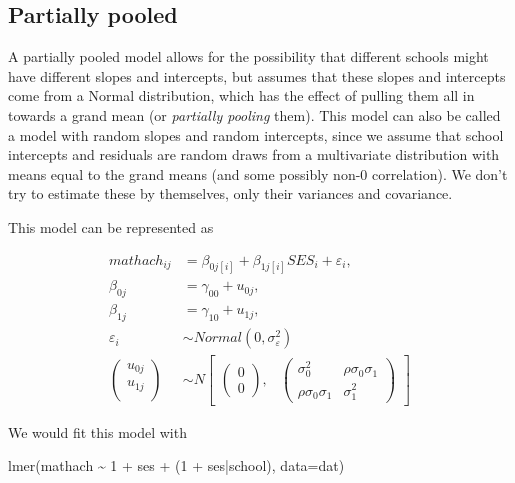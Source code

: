 \documentclass[
  letterpaper,
  DIV=11,
  numbers=noendperiod]{scrreprt}
\newenvironment{Shaded}{\begin{snugshade}}{\end{snugshade}}
\newcommand{\AttributeTok}[1]{\textcolor[rgb]{0.49,0.56,0.16}{#1}}
\newcommand{\DecValTok}[1]{\textcolor[rgb]{0.25,0.63,0.44}{#1}}
\newcommand{\FunctionTok}[1]{\textcolor[rgb]{0.02,0.16,0.49}{#1}}
\newcommand{\NormalTok}[1]{\textcolor[rgb]{0.00,0.44,0.13}{#1}}
\newcommand{\SpecialCharTok}[1]{\textcolor[rgb]{0.25,0.44,0.63}{#1}}
\begin{document}
\hypertarget{partially-pooled}{%
\subsection{Partially pooled}\label{partially-pooled}}

A partially pooled model allows for the possibility that different
schools might have different slopes and intercepts, but assumes that
these slopes and intercepts come from a Normal distribution, which has
the effect of pulling them all in towards a grand mean (or
\emph{partially pooling} them). This model can also be called a model
with random slopes and random intercepts, since we assume that school
intercepts and residuals are random draws from a multivariate
distribution with means equal to the grand means (and some possibly
non-0 correlation). We don't try to estimate these by themselves, only
their variances and covariance.

This model can be represented as

\[\begin{aligned}
mathach_{ij} &= \beta_{0j[i]} + \beta_{1j[i]}SES_i + \varepsilon_i, \\
    \beta_{0j} &= \gamma_{00} + u_{0j},\\
    \beta_{1j} &= \gamma_{10} + u_{1j},\\
    \varepsilon_i &\sim Normal(0, \sigma^2_\varepsilon) \\
    \begin{pmatrix}
        u_{0j}\\
        u_{1j}\\
    \end{pmatrix} &\sim  N
    \begin{bmatrix}
        \begin{pmatrix}
            0\\
            0
        \end{pmatrix}\!\!,&
        \begin{pmatrix}
            \sigma^2_0 & \rho\sigma_0\sigma_1\\
            \rho\sigma_0\sigma_1 & \sigma^2_1
        \end{pmatrix}
    \end{bmatrix}
\end{aligned}\]

We would fit this model with

\begin{Shaded}
\begin{Highlighting}[]
\FunctionTok{lmer}\NormalTok{(mathach }\SpecialCharTok{\textasciitilde{}} \DecValTok{1} \SpecialCharTok{+}\NormalTok{ ses }\SpecialCharTok{+}\NormalTok{ (}\DecValTok{1} \SpecialCharTok{+}\NormalTok{ ses}\SpecialCharTok{|}\NormalTok{school), }\AttributeTok{data=}\NormalTok{dat)}
\end{Highlighting}
\end{Shaded}
\end{document}
